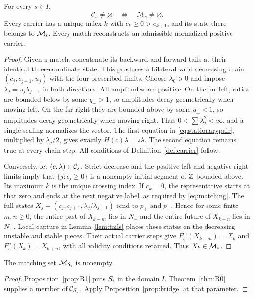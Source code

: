 \begin{proposition}\label{prop:bridge}
For every \(s\in I\),
\begin{equation}\label{eq:bridge}
 \mathcal C_s\ne\varnothing\quad\Longleftrightarrow\quad
 \mathcal M_s\ne\varnothing.
\end{equation}
Every carrier has a unique index \(k\) with \(c_k\ge0>c_{k+1}\), and its
state there belongs to \(\mathcal M_s\). Every match reconstructs an admissible
normalized positive carrier.
\end{proposition}
\begin{proof}
Given a match, concatenate its backward and forward tails at their identical
three-coordinate state. This produces a bilateral valid decreasing chain
\((c_j,c_{j+1},u_j)\) with the four prescribed limits. Choose
\(\lambda_0>0\) and impose \(\lambda_j=u_j\lambda_{j-1}\) in both
directions. All amplitudes are positive. On the far left, ratios are bounded
below by some \(q_->1\), so amplitudes decay geometrically when moving
left. On the far right they are bounded above by some \(q_+<1\), so
amplitudes decay geometrically when moving right. Thus
\(0<\sum\lambda_j^2<\infty\), and a single scaling normalizes the vector.
The first equation in \eqref{eq:stationarypair}, multiplied by
\(\lambda_j/2\), gives exactly \(H(c)\lambda=s\lambda\).
The second equation remains true at every chain step. All conditions of
Definition~\ref{def:carrier} follow.

Conversely, let \((c,\lambda)\in\mathcal C_s\). Strict decrease and the positive
left and negative right limits imply that \(\{j:c_j\ge0\}\) is a nonempty
initial segment of \(\mathbb Z\) bounded above. Its maximum \(k\) is the unique
crossing index. If \(c_k=0\), the representative starts at that zero and
ends at the next negative label, as required by \eqref{eq:matching}.
The full states \(X_j=(c_j,c_{j+1},\lambda_j/\lambda_{j-1})\) tend to
\(p_+\) and \(p_-\). Hence for some finite \(m,n\ge0\), the entire past
of \(X_{k-m}\) lies in \(N_+\) and the entire future of \(X_{k+n}\) lies
in \(N_-\). Local capture in Lemma~\ref{lem:tails} places these states on
the decreasing unstable and stable pieces. Their actual carrier steps give
\(F_s^m(X_{k-m})=X_k\) and \(F_s^n(X_k)=X_{k+n}\), with all validity
conditions retained. Thus \(X_k\in\mathcal M_s\).
\end{proof}

\begin{proposition}\label{prop:existmatch}
The matching set \(\mathcal M_{S_{\mathrm t}}\) is nonempty.
\end{proposition}
\begin{proof}
Proposition~\ref{prop:R1} puts \(S_{\mathrm t}\) in the domain \(I\).
Theorem~\ref{thm:R0} supplies a member of \(\mathcal C_{S_{\mathrm t}}\).
Apply Proposition~\ref{prop:bridge} at that parameter.
\end{proof}
